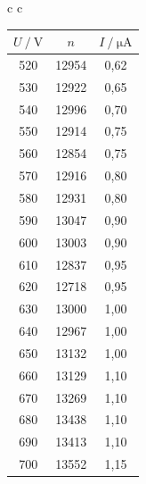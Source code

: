 \begin{table}[H]
\begin{tabular}{c c}
        \begin{tabular}{c c c} 
            \hline
            \toprule
            $U \mathbin{/} \mathrm{V}$ & $n$ &  $I \mathbin{/} \unit{\micro\ampere}$ \\
            \midrule
            520 & 12954 &      0,62 \\
            530 & 12922 &      0,65 \\
            540 & 12996 &      0,70 \\
            550 & 12914 &      0,75 \\
            560 & 12854 &      0,75 \\
            570 & 12916 &      0,80 \\
            580 & 12931 &      0,80 \\
            590 & 13047 &      0,90 \\
            600 & 13003 &      0,90 \\
            610 & 12837 &      0,95 \\
            620 & 12718 &      0,95 \\
            630 & 13000 &      1,00 \\
            640 & 12967 &      1,00 \\
            650 & 13132 &      1,00 \\
            660 & 13129 &      1,10 \\
            670 & 13269 &      1,10 \\
            680 & 13438 &      1,10 \\
            690 & 13413 &      1,10 \\
            700 & 13552 &      1,15 \\
            \bottomrule
            \hline
        \end{tabular} \\
    \end{tabular}

\end{table}

